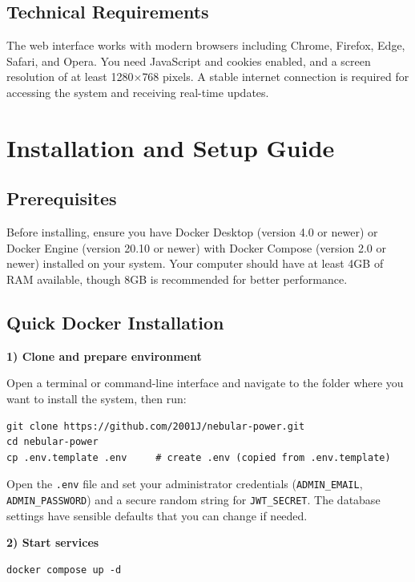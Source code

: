 \subsection{Technical Requirements}

The web interface works with modern browsers including Chrome, Firefox, Edge, Safari, and Opera. You need JavaScript and cookies enabled, and a screen resolution of at least 1280$\times$768 pixels. A stable internet connection is required for accessing the system and receiving real-time updates.

\section{Installation and Setup Guide}
\label{sec:installation-setup}

\subsection{Prerequisites}
\label{subsec:prerequisites}

Before installing, ensure you have Docker Desktop (version 4.0 or newer) or Docker Engine (version 20.10 or newer) with Docker Compose (version 2.0 or newer) installed on your system. Your computer should have at least 4GB of RAM available, though 8GB is recommended for better performance.

\subsection{Quick Docker Installation}
\label{subsec:docker-installation}

\textbf{1) Clone and prepare environment}

Open a terminal or command-line interface and navigate to the folder where you want to install the system, then run:

\begin{verbatim}
git clone https://github.com/2001J/nebular-power.git
cd nebular-power
cp .env.template .env     # create .env (copied from .env.template)
\end{verbatim}

Open the \texttt{.env} file and set your administrator credentials (\texttt{ADMIN\_EMAIL}, \texttt{ADMIN\_PASSWORD}) and a secure random string for \texttt{JWT\_SECRET}. The database settings have sensible defaults that you can change if needed.

\textbf{2) Start services}
\begin{verbatim}
docker compose up -d
\end{verbatim}

